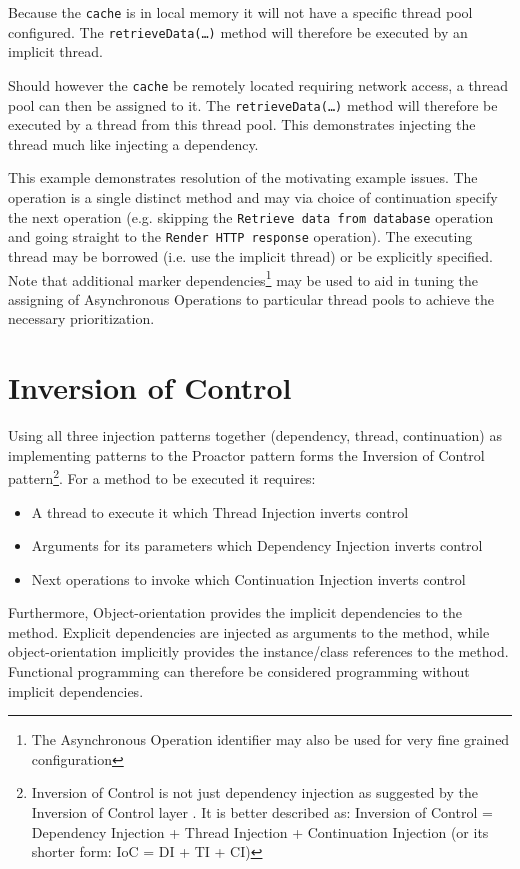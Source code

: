 \documentclass[prodmode]{style/acmlarge}
\begin{document}
Because the \texttt{cache} is in local memory it will not have a specific thread
pool configured.  The \texttt{retrieveData(\ldots)} method will therefore be
executed by an implicit thread.

Should however the \texttt{cache} be remotely located requiring network access,
a thread pool can then be assigned to it.  The \texttt{retrieveData(\ldots)}
method will therefore be executed by a thread from this thread pool.  This
demonstrates injecting the thread much like injecting a dependency.

This example demonstrates resolution of the motivating example issues.  The
operation is a single distinct method and may via choice of continuation specify
the next operation (e.g. skipping the \texttt{Retrieve data from database}
operation and going straight to the \texttt{Render HTTP response} operation).
The executing thread may be borrowed (i.e. use the implicit thread) or be
explicitly specified.  Note that additional marker dependencies\footnote{The
Asynchronous Operation identifier may also be used for very fine grained
configuration} may be used to aid in tuning the assigning of Asynchronous
Operations to particular thread pools to achieve the necessary prioritization.


\section{Inversion of Control}

Using all three injection patterns together (dependency, thread, continuation)
as implementing patterns to the Proactor pattern forms the Inversion of Control
pattern\footnote{Inversion of Control is not just dependency injection as
suggested by the Inversion of Control layer \cite{ioc}.  It is better described
as: Inversion of Control = Dependency Injection + Thread Injection +
Continuation Injection (or its shorter form: IoC = DI + TI + CI)}.  For a method
to be executed it requires:

\begin{itemize}
  \item A thread to execute it which Thread Injection inverts control
  \item Arguments for its parameters which Dependency Injection inverts control
  \item Next operations to invoke which Continuation Injection inverts control
\end{itemize}

Furthermore, Object-orientation provides the implicit dependencies to the
method.  Explicit dependencies are injected as arguments to the method, while
object-orientation implicitly provides the instance/class references to the
method.  Functional programming can therefore be considered programming without
implicit dependencies.
\end{document}
